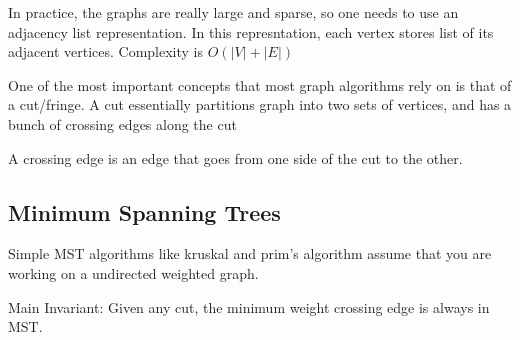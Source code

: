 \documentclass[10pt,a4paper]{article}
\begin{document}
	In practice, the graphs are really large and sparse, so one needs to use an adjacency list representation. In this represntation, each vertex stores list of its adjacent vertices. Complexity is $O(|V| + |E|)$
	
	One of the most important concepts that most graph algorithms rely on is that of a cut/fringe. A cut essentially partitions graph into two sets of vertices, and has a bunch of crossing edges along the cut
	
	A crossing edge is an edge that goes from one side of the cut to the other.
	
	\subsection{Minimum Spanning Trees}
	
	Simple MST algorithms like kruskal and prim's algorithm assume that you are working on a undirected weighted graph. 
	
	Main Invariant: Given any cut, the minimum weight crossing edge is always in MST.
\end{document}
